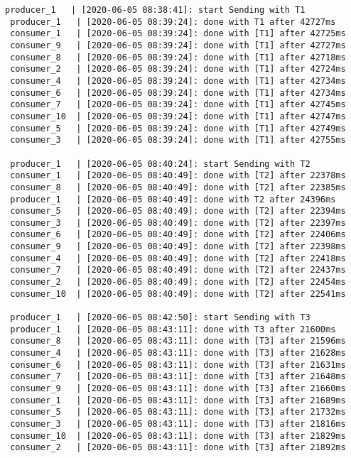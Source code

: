 \begin{lstlisting}[caption=Apache Kafka benchmark results, label=listing:kafkabenchmark]
 producer_1   | [2020-06-05 08:38:41]: start Sending with T1
 producer_1   | [2020-06-05 08:39:24]: done with T1 after 42727ms
 consumer_1   | [2020-06-05 08:39:24]: done with [T1] after 42725ms
 consumer_9   | [2020-06-05 08:39:24]: done with [T1] after 42727ms
 consumer_8   | [2020-06-05 08:39:24]: done with [T1] after 42718ms
 consumer_2   | [2020-06-05 08:39:24]: done with [T1] after 42724ms
 consumer_4   | [2020-06-05 08:39:24]: done with [T1] after 42734ms
 consumer_6   | [2020-06-05 08:39:24]: done with [T1] after 42734ms
 consumer_7   | [2020-06-05 08:39:24]: done with [T1] after 42745ms
 consumer_10  | [2020-06-05 08:39:24]: done with [T1] after 42747ms
 consumer_5   | [2020-06-05 08:39:24]: done with [T1] after 42749ms
 consumer_3   | [2020-06-05 08:39:24]: done with [T1] after 42755ms
 
 producer_1   | [2020-06-05 08:40:24]: start Sending with T2
 consumer_1   | [2020-06-05 08:40:49]: done with [T2] after 22378ms
 consumer_8   | [2020-06-05 08:40:49]: done with [T2] after 22385ms
 producer_1   | [2020-06-05 08:40:49]: done with T2 after 24396ms
 consumer_5   | [2020-06-05 08:40:49]: done with [T2] after 22394ms
 consumer_3   | [2020-06-05 08:40:49]: done with [T2] after 22397ms
 consumer_6   | [2020-06-05 08:40:49]: done with [T2] after 22406ms
 consumer_9   | [2020-06-05 08:40:49]: done with [T2] after 22398ms
 consumer_4   | [2020-06-05 08:40:49]: done with [T2] after 22418ms
 consumer_7   | [2020-06-05 08:40:49]: done with [T2] after 22437ms
 consumer_2   | [2020-06-05 08:40:49]: done with [T2] after 22454ms
 consumer_10  | [2020-06-05 08:40:49]: done with [T2] after 22541ms
 
 producer_1   | [2020-06-05 08:42:50]: start Sending with T3
 producer_1   | [2020-06-05 08:43:11]: done with T3 after 21600ms
 consumer_8   | [2020-06-05 08:43:11]: done with [T3] after 21596ms 
 consumer_4   | [2020-06-05 08:43:11]: done with [T3] after 21628ms 
 consumer_6   | [2020-06-05 08:43:11]: done with [T3] after 21631ms 
 consumer_7   | [2020-06-05 08:43:11]: done with [T3] after 21648ms 
 consumer_9   | [2020-06-05 08:43:11]: done with [T3] after 21660ms 
 consumer_1   | [2020-06-05 08:43:11]: done with [T3] after 21689ms 
 consumer_5   | [2020-06-05 08:43:11]: done with [T3] after 21732ms 
 consumer_3   | [2020-06-05 08:43:11]: done with [T3] after 21816ms 
 consumer_10  | [2020-06-05 08:43:11]: done with [T3] after 21829ms 
 consumer_2   | [2020-06-05 08:43:11]: done with [T3] after 21892ms 
\end{lstlisting}

